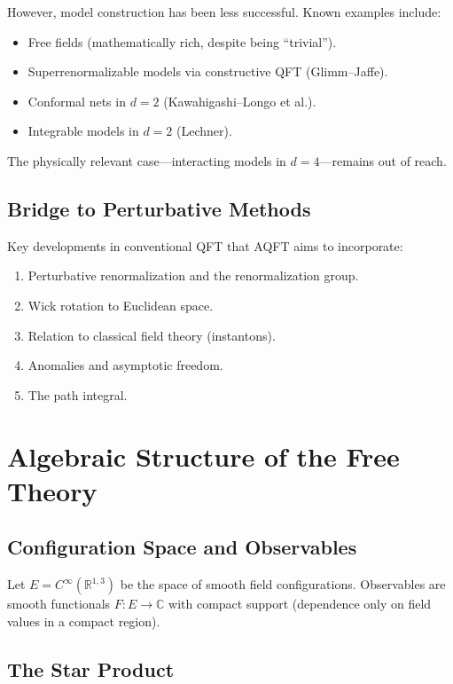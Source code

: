 \documentclass[11pt,a4paper]{article}
\begin{document}
However, model construction has been less successful. Known examples include:
\begin{itemize}[nosep]
  \item Free fields (mathematically rich, despite being ``trivial'').
  \item Superrenormalizable models via constructive QFT (Glimm--Jaffe).
  \item Conformal nets in $d=2$ (Kawahigashi--Longo et al.).
  \item Integrable models in $d=2$ (Lechner).
\end{itemize}

The physically relevant case---interacting models in $d=4$---remains out of reach.

\subsection{Bridge to Perturbative Methods}

Key developments in conventional QFT that AQFT aims to incorporate:
\begin{enumerate}[nosep]
  \item Perturbative renormalization and the renormalization group.
  \item Wick rotation to Euclidean space.
  \item Relation to classical field theory (instantons).
  \item Anomalies and asymptotic freedom.
  \item The path integral.
\end{enumerate}

\section{Algebraic Structure of the Free Theory}

\subsection{Configuration Space and Observables}

Let $E = C^\infty(\mathbb{R}^{1,3})$ be the space of smooth field
configurations. Observables are smooth functionals $F: E \to \mathbb{C}$
with compact support (dependence only on field values in a compact region).

\subsection{The Star Product}
\end{document}
